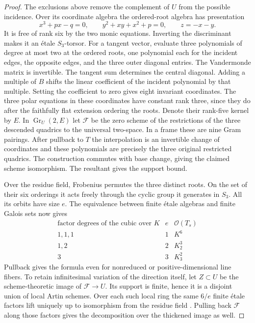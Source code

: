 \begin{proof}
The exclusions above remove the complement of \(U\) from the possible
incidence. Over its coordinate algebra the ordered-root algebra has
presentation
\[
  x^3+px-q=0,\qquad y^2+xy+x^2+p=0,\qquad z=-x-y .
\]
It is free of rank six by the two monic equations. Inverting the
discriminant makes it an étale \(S_3\)-torsor.
For a tangent vector, evaluate three polynomials of degree at most two
at the ordered roots, one polynomial each for the incident edges, the
opposite edges, and the three outer diagonal entries. The Vandermonde
matrix is invertible. The tangent sum determines the central diagonal.
Adding a multiple of \(B\) shifts the linear coefficient of the
incident polynomial by that multiple. Setting the coefficient to zero
gives eight invariant coordinates. The three polar equations in these
coordinates have constant rank three, since they do after the faithfully
flat extension ordering the roots. Denote their rank-five kernel by
\(E\). In \(\operatorname{Gr}_U(2,E)\) let \(\mathcal F\) be the zero scheme
of the restrictions of the three descended quadrics to the universal
two-space. In a frame these are nine Gram pairings. After pullback to
\(T\) the interpolation is an invertible change of coordinates and
these polynomials are precisely the three original restricted quadrics.
The construction commutes with base change, giving the claimed scheme
isomorphism. The resultant gives the support bound.

Over the residue field, Frobenius permutes the three distinct roots.
On the set of their six orderings it acts freely through the cyclic
group it generates in \(S_3\). All its orbits have size \(e\).
The equivalence between finite étale algebras and finite Galois sets
\cite{stacksEtalePoint} now gives
\[
\begin{array}{c|c|c}
 \text{factor degrees of the cubic over }K & e & \mathcal O(T_s)\\ \hline
 1,1,1 &1&K^6\\
 1,2   &2&K_2^3\\
 3     &3&K_3^2
\end{array}
\]
Pullback gives the formula even for nonreduced or positive-dimensional
line fibers. To retain infinitesimal variation of the direction itself,
let \(Z\subset U\) be the scheme-theoretic image of \(\mathcal F\to U\).
Its support is finite, hence it is a disjoint union of local Artin
schemes. Over each such local ring the same \(6/e\) finite étale
factors lift uniquely up to isomorphism from the residue field
\cite{stacksHenselianEtale}. Pulling back \(\mathcal F\) along those
factors gives the decomposition over the thickened image as well.
\end{proof}

